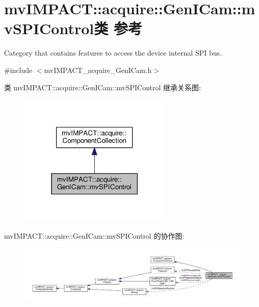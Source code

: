 \hypertarget{classmv_i_m_p_a_c_t_1_1acquire_1_1_gen_i_cam_1_1mv_s_p_i_control}{\section{mv\+I\+M\+P\+A\+C\+T\+:\+:acquire\+:\+:Gen\+I\+Cam\+:\+:mv\+S\+P\+I\+Control类 参考}
\label{classmv_i_m_p_a_c_t_1_1acquire_1_1_gen_i_cam_1_1mv_s_p_i_control}
}


Category that contains features to access the device internal S\+P\+I bus.  




{\ttfamily \#include $<$mv\+I\+M\+P\+A\+C\+T\+\_\+acquire\+\_\+\+Gen\+I\+Cam.\+h$>$}



类 mv\+I\+M\+P\+A\+C\+T\+:\+:acquire\+:\+:Gen\+I\+Cam\+:\+:mv\+S\+P\+I\+Control 继承关系图\+:
\nopagebreak
\begin{figure}[H]
\begin{center}
\leavevmode
\includegraphics[width=206pt]{classmv_i_m_p_a_c_t_1_1acquire_1_1_gen_i_cam_1_1mv_s_p_i_control__inherit__graph}
\end{center}
\end{figure}


mv\+I\+M\+P\+A\+C\+T\+:\+:acquire\+:\+:Gen\+I\+Cam\+:\+:mv\+S\+P\+I\+Control 的协作图\+:
\nopagebreak
\begin{figure}[H]
\begin{center}
\leavevmode
\includegraphics[width=350pt]{classmv_i_m_p_a_c_t_1_1acquire_1_1_gen_i_cam_1_1mv_s_p_i_control__coll__graph}
\end{center}
\end{figure}
